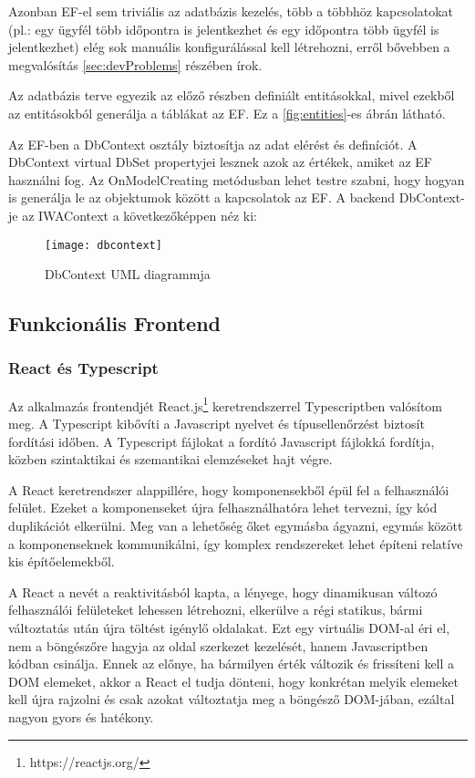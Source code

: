 Azonban EF-el sem triviális az adatbázis kezelés, több a többhöz kapcsolatokat (pl.: egy ügyfél több időpontra is jelentkezhet és egy időpontra több ügyfél is jelentkezhet) elég sok manuális konfigurálással kell létrehozni, erről bővebben a megvalósítás \ref{sec:devProblems} részében írok.

Az adatbázis terve egyezik az előző részben definiált entitásokkal, mivel ezekből az entitásokból generálja a táblákat az EF. Ez a \ref{fig:entities}-es ábrán látható.

Az EF-ben a DbContext osztály biztosítja az adat elérést és definíciót. A DbContext virtual DbSet propertyjei lesznek azok az értékek, amiket az EF használni fog. Az OnModelCreating metódusban lehet testre szabni, hogy hogyan is generálja le az objektumok között a kapcsolatok az EF. A backend DbContext-je az IWAContext a következőképpen néz ki:

\begin{figure}[H]
	\centering
	\texttt{[image: dbcontext]}
	\caption{DbContext UML diagrammja}
	\label{fig:dbcontext}
\end{figure}


\subsection{Funkcionális Frontend}
\subsubsection{React és Typescript}

Az alkalmazás frontendjét React.js\footnote{https://reactjs.org/} keretrendszerrel Typescriptben valósítom meg. A Typescript kibővíti a Javascript nyelvet és típusellenőrzést biztosít fordítási időben. A Typescript fájlokat a fordító Javascript fájlokká fordítja, közben szintaktikai és szemantikai elemzéseket hajt végre.

A React keretrendszer alappillére, hogy komponensekből épül fel a felhasználói felület. Ezeket a komponenseket újra felhasználhatóra lehet tervezni, így kód duplikációt elkerülni. Meg van a lehetőség őket egymásba ágyazni, egymás között a komponenseknek kommunikálni, így komplex rendszereket lehet építeni relatíve kis építőelemekből.

A React a nevét a reaktivitásból kapta, a lényege, hogy dinamikusan változó felhasználói felületeket lehessen létrehozni, elkerülve a régi statikus, bármi változtatás után újra töltést igénylő oldalakat. Ezt egy virtuális DOM-al éri el, nem a böngészőre hagyja az oldal szerkezet kezelését, hanem Javascriptben kódban csinálja. Ennek az előnye, ha bármilyen érték változik és frissíteni kell a DOM elemeket, akkor a React el tudja dönteni, hogy konkrétan melyik elemeket kell újra rajzolni és csak azokat változtatja meg a böngésző DOM-jában, ezáltal nagyon gyors és hatékony.

